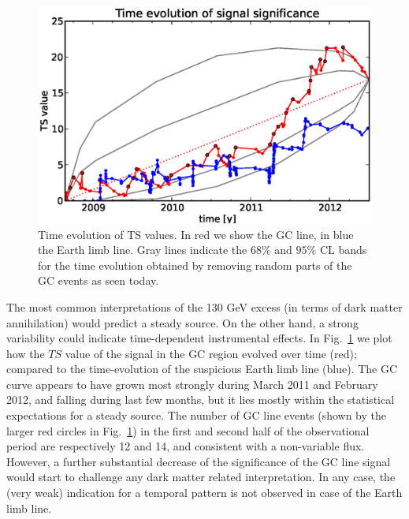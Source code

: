 \documentclass[aps,twocolumn,prd,superscriptaddress,showpacs,nofootinbib,fixfloat]{revtex4}
\begin{document}
\begin{figure}
  \begin{center}
    \includegraphics[width=1.0\linewidth]{plots/TS_time.eps}
  \end{center}
  \caption{Time evolution of TS values. In red we show the
  GC line, in blue the Earth limb line. Gray lines indicate
  the $68\%$ and $95\%$ CL bands for the time evolution
  obtained by removing random parts of the GC events as seen
  today.}
  \label{fig:timeevolution}
\end{figure}

The most common interpretations of the 130 GeV excess (in
terms of dark matter annihilation) would predict a steady
source. On the other hand, a strong variability could
indicate time-dependent instrumental effects. In
Fig.~\ref{fig:timeevolution} we plot how the $TS$ value of
the signal in the GC region evolved over time (red);
compared to the time-evolution of the suspicious Earth limb
line (blue). The GC curve appears to have grown most
strongly during March 2011 and February 2012, and falling
during last few months, but it lies mostly within the
statistical expectations for a steady source. The number of
GC line events (shown by the larger red circles in
Fig.~\ref{fig:timeevolution}) in the first and second half
of the observational period are respectively 12 and 14, and
consistent with a non-variable flux. However, a further
substantial decrease of the significance of the GC line
signal would start to challenge any dark matter related
interpretation.  In any case, the (very weak) indication for
a temporal pattern is not observed in case of the Earth limb
line. 

\end{document}
